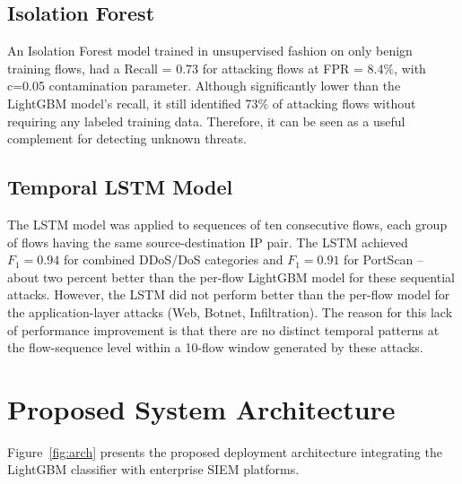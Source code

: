 \subsection{Isolation Forest}

An Isolation Forest model trained in unsupervised fashion on only benign training flows, had a Recall = 0.73 for attacking flows at FPR = 8.4$\%$, with c=0.05 contamination parameter. Although significantly lower than the LightGBM model's recall, it still identified 73$\%$ of attacking flows without requiring any labeled training data. Therefore, it can be seen as a useful complement for detecting unknown threats.

\subsection{Temporal LSTM Model }

The LSTM model was applied to sequences of ten consecutive flows, each group of flows having the same source-destination IP pair. The LSTM achieved $F_1 = 0.94$ for combined DDoS/DoS categories and $F_1 = 0.91$ for PortScan -- about two percent better than the per-flow LightGBM model for these sequential attacks. However, the LSTM did not perform better than the per-flow model for the application-layer attacks (Web, Botnet, Infiltration). The reason for this lack of performance improvement is that there are no distinct temporal patterns at the flow-sequence level within a 10-flow window generated by these attacks.

\section{Proposed System Architecture}

Figure~\ref{fig:arch} presents the proposed deployment architecture integrating the LightGBM classifier with enterprise SIEM platforms.

